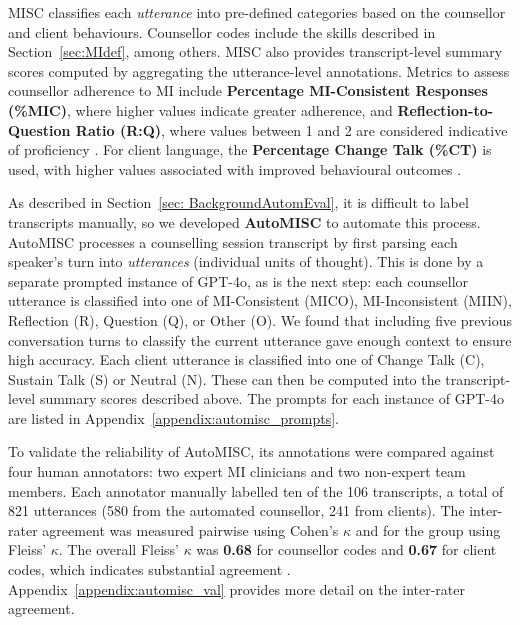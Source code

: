 MISC classifies each \emph{utter\-ance} into pre\--defined categories based on the counsellor and client behaviours. Counsellor codes include the skills described in Section~\ref{sec:MIdef}, among others. MISC also provides transcript-level summary scores computed by aggregating the utterance-level annotations. Metrics to assess counsellor adherence to MI include \textbf{Percentage MI-Consistent Responses (\%MIC)}, where higher values indicate greater adherence, and \textbf{Reflection-to-Question Ratio (R:Q)}, where values between 1 and 2 are considered indicative of proficiency \cite{moyers2016miti}. For client language, the \textbf{Percentage Change Talk (\%CT)} is used, with higher values associated with improved behavioural outcomes \cite{Apodaca2009}.

As described in Section~\ref{sec: BackgroundAutomEval}, it is difficult to label transcripts manually, so we developed \textbf{AutoMISC} to automate this process. AutoMISC processes a counselling session transcript by first parsing each speaker's turn into \textit{utterances} (individual units of thought). This is done by a separate prompted instance of GPT-4o, as is the next step: each counsellor utterance is classified into one of MI-Consistent (MICO), MI-Inconsistent (MIIN), Reflection (R), Question (Q), or Other (O).
We found that including five previous conversation turns to classify the current utterance gave enough context to ensure high accuracy.
Each client utterance is classified into one of Change Talk (C), Sustain Talk (S) or Neutral (N). These can then be computed into the transcript-level summary scores described above. The prompts for each instance of GPT-4o are listed in Appendix~\ref{appendix:automisc_prompts}.

To validate the reliability of AutoMISC, its annotations were compared against four human annotators: two expert MI clinicians and two non-expert team members. Each annotator manually labelled ten of the 106 transcripts, a total of 821 utterances (580 from the automated counsellor, 241 from clients). The inter-rater agreement was measured pairwise using Cohen's $\kappa$ and for the group using Fleiss' $\kappa$. The overall Fleiss' $\kappa$ was \textbf{0.68} for counsellor codes and \textbf{0.67} for client codes, which indicates substantial agreement \cite{cohenrange}.  Appendix~\ref{appendix:automisc_val} provides more detail on the inter-rater agreement.